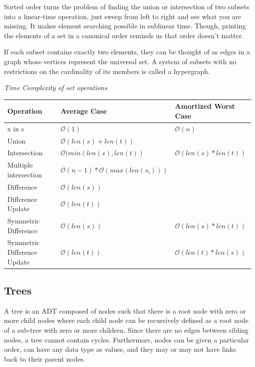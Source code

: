 \documentclass{article}
\newcommand{\bigO}{\mathcal{O}}
\begin{document}
    Sorted order turns the problem of finding the union or intersection of two subsets into a linear-time operation, just sweep from left to right and see what you are missing. It makes element searching possible in sublinear time. Though, printing the elements of a set in a canonical order reminds us that order doesn’t matter.
    
    If each subset contains exactly two elements, they can be thought of as edges in a graph whose vertices represent the universal set. A system of subsets with no restrictions on the cardinality of its members is called a hypergraph.
    
    \vspace{8pt} \emph{Time Complexity of set operations}
    \begin{table}[H]
        \begin{tabular}{|l|l|l|}
            \hline
            \textbf{Operation} & \textbf{Average Case} & \textbf{Amortized Worst Case} \\
            \hline
            x in s & $\bigO(1)$ & $\bigO(n)$ \\
            Union & $\bigO(len(s)+len(t))$  & \\
            Intersection & $\bigO(min(len(s), len(t))$ & $\bigO(len(s) * len(t))$ \\
            Multiple intersection & $\bigO(n-1)*\bigO(max(len(s_i)))$ &\\
            Difference & $\bigO(len(s))$ & \\
            Difference Update & $\bigO(len(t))$ & \\
            Symmetric Difference & $\bigO(len(s))$ & $\bigO(len(s) * len(t))$ \\
            Symmetric Difference Update & $\bigO(len(t))$ & $\bigO(len(t) * len(s))$\\
            \hline
        \end{tabular}
    \end{table}

    \subsection{Trees}
    A tree is an ADT composed of nodes such that there is a root node with zero or more child nodes where each child node can be recursively defined as a root node of a sub-tree with zero or more children. Since there are no edges between sibling nodes, a tree cannot contain cycles. Furthermore, nodes can be given a particular order, can have any data type as values, and they may or may not have links back to their parent nodes.
    
\end{document}
